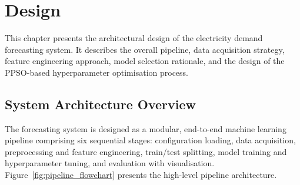 \chapter{Design}\label{ch:Design}

This chapter presents the architectural design of the electricity demand forecasting system. It describes the overall pipeline, data acquisition strategy, feature engineering approach, model selection rationale, and the design of the PPSO-based hyperparameter optimisation process.


\section{System Architecture Overview}

The forecasting system is designed as a modular, end-to-end machine learning pipeline comprising six sequential stages: configuration loading, data acquisition, preprocessing and feature engineering, train/test splitting, model training and hyperparameter tuning, and evaluation with visualisation. Figure~\ref{fig:pipeline_flowchart} presents the high-level pipeline architecture.

